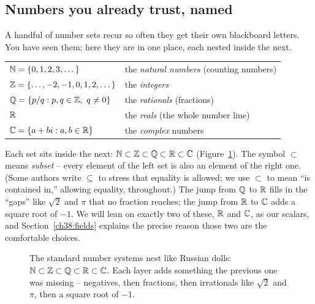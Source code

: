 \subsection{Numbers you already trust, named}

A handful of number sets recur so often they get their own blackboard letters. You have
seen them; here they are in one place, each nested inside the next.

\begin{center}
\begin{tabular}{ll}
\toprule
$\mathbb{N} = \{0, 1, 2, 3, \dots\}$ & the \emph{natural numbers} (counting numbers) \\
$\mathbb{Z} = \{\dots, -2, -1, 0, 1, 2, \dots\}$ & the \emph{integers} \\
$\mathbb{Q} = \{p/q : p,q \in \mathbb{Z},\ q \ne 0\}$ & the \emph{rationals} (fractions) \\
$\mathbb{R}$ & the \emph{reals} (the whole number line) \\
$\mathbb{C} = \{a + bi : a,b \in \mathbb{R}\}$ & the \emph{complex} numbers \\
\bottomrule
\end{tabular}
\end{center}

Each set sits inside the next: $\mathbb{N} \subset \mathbb{Z} \subset \mathbb{Q} \subset \mathbb{R} \subset \mathbb{C}$
(Figure~\ref{ch38:numbernest}). The
symbol $\subset$ means \emph{subset} -- every element of the left set is also an element
of the right one. (Some authors write $\subseteq$ to stress that equality is allowed; we
use $\subset$ to mean ``is contained in,'' allowing equality, throughout.) The jump from
$\mathbb{Q}$ to $\mathbb{R}$ fills in the ``gaps'' like $\sqrt{2}$ and $\pi$ that no fraction reaches; the
jump from $\mathbb{R}$ to $\mathbb{C}$ adds a square root of $-1$. We will lean on exactly two of these,
$\mathbb{R}$ and $\mathbb{C}$, as our scalars, and Section~\ref{ch38:fields} explains the precise reason
those two are the comfortable choices.

\begin{figure}[H]
\centering
{}
\caption{The standard number systems nest like Russian dolls:
$\mathbb{N} \subset \mathbb{Z} \subset \mathbb{Q} \subset \mathbb{R} \subset \mathbb{C}$. Each layer adds something the previous
one was missing -- negatives, then fractions, then irrationals like $\sqrt 2$ and $\pi$,
then a square root of $-1$.}
\label{ch38:numbernest}
\end{figure}

